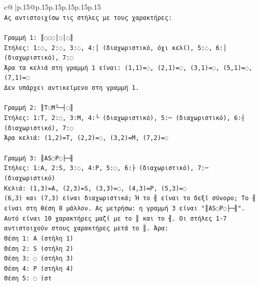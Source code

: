 \documentclass{article}
\begin{document}
{\begin{supertabular}{c@{$\;$}|p{.15\linewidth}@{}p{.15\linewidth}p{.15\linewidth}p{.15\linewidth}p{.15\linewidth}p{.15\linewidth}}
{{{\\ 
\texttt{Ας αντιστοιχίσω τις στήλες με τους χαρακτήρες:} \\
\\ 
\texttt{Γραμμή 1: ║◌◌◌│◌│◌║} \\
\texttt{Στήλες: 1:◌, 2:◌, 3:◌, 4:│ (διαχωριστικό, όχι κελί), 5:◌, 6:│ (διαχωριστικό), 7:◌} \\
\texttt{Άρα τα κελιά στη γραμμή 1 είναι: (1,1)=◌, (2,1)=◌, (3,1)=◌, (5,1)=◌, (7,1)=◌} \\
\texttt{Δεν υπάρχει αντικείμενο στη γραμμή 1.} \\
\\ 
\texttt{Γραμμή 2: ║T◌M└─┤◌║} \\
\texttt{Στήλες: 1:T, 2:◌, 3:M, 4:└ (διαχωριστικό), 5:─ (διαχωριστικό), 6:┤ (διαχωριστικό), 7:◌} \\
\texttt{Άρα κελιά: (1,2)=T, (2,2)=◌, (3,2)=M, (7,2)=◌} \\
\\ 
\texttt{Γραμμή 3: ║AS◌P◌├─╢} \\
\texttt{Στήλες: 1:A, 2:S, 3:◌, 4:P, 5:◌, 6:├ (διαχωριστικό), 7:─ (διαχωριστικό)} \\
\texttt{Κελιά: (1,3)=A, (2,3)=S, (3,3)=◌, (4,3)=P, (5,3)=◌} \\
\texttt{(6,3) και (7,3) είναι διαχωριστικά; Ή το ╢ είναι το δεξί σύνορο; Το ╢ είναι στη θέση 8 μάλλον. Ας μετρήσω: η γραμμή 3 είναι "║AS◌P◌├─╢". Αυτό είναι 10 χαρακτήρες μαζί με το ║ και το ╢. Οι στήλες 1{-}7 αντιστοιχούν στους χαρακτήρες μετά το ║. Άρα: } \\
\texttt{Θέση 1: A (στήλη 1)} \\
\texttt{Θέση 2: S (στήλη 2)} \\
\texttt{Θέση 3: ◌ (στήλη 3)} \\
\texttt{Θέση 4: P (στήλη 4)} \\
\texttt{Θέση 5: ◌ (στ} \\
            }
        }
    }
     \\ \\


\end{supertabular}}
\end{document}
